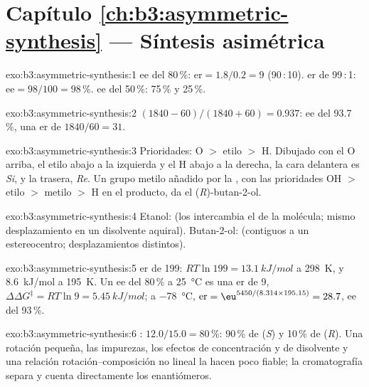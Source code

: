 \section*{Capítulo \ref{ch:b3:asymmetric-synthesis} --- Síntesis asimétrica}

\begin{solution}{exo:b3:asymmetric-synthesis:1}
ee del 80\,\%: $\mathrm{er} = 1.8/0.2 = 9$ (90\,:\,10). er de 99\,:\,1: $\mathrm{ee} = 98/100 = 98$\,\%. ee del 50\,\%: 75\,\% y 25\,\%.
\end{solution}

\begin{solution}{exo:b3:asymmetric-synthesis:2}
$(1840 - 60)/(1840 + 60) = 0.937$: ee del 93.7\,\%, una er de $1840/60 = 31$.
\end{solution}

\begin{solution}{exo:b3:asymmetric-synthesis:3}
Prioridades: O $>$ etilo $>$ H. Dibujado con el O arriba, el etilo abajo a la izquierda y el H abajo a la derecha, la
cara delantera es \textit{Si}, y la trasera, \textit{Re}. Un grupo metilo añadido por la , con
las prioridades OH $>$ etilo $>$ metilo $>$ H en el producto, da el (\textit{R})-butan-2-ol.
\end{solution}

\begin{solution}{exo:b3:asymmetric-synthesis:4}
Etanol:  (los intercambia el  de la molécula; mismo
desplazamiento en un disolvente aquiral). Butan-2-ol:  (contiguos a un estereocentro;
desplazamientos distintos).
\end{solution}

\begin{solution}{exo:b3:asymmetric-synthesis:5}
er de 199: $RT\ln 199 = \qty{13.1}{kJ/mol}$ a \qty{298}{K}, y \qty{8.6}{kJ/mol} a \qty{195}{K}. Un ee del 80\,\% a \qty{25}{\celsius} es una er de 9,
$\Delta\Delta G^\ddagger = RT\ln 9 = \qty{5.45}{kJ/mol}$; a \qty{-78}{\celsius}, $\mathrm{er} = \eu^{5450/(8.314 \times 195.15)} = 28.7$, ee del 93\,\%.
\end{solution}

\begin{solution}{exo:b3:asymmetric-synthesis:6}
: $12.0/15.0 = 80$\,\%: 90\,\% de (\textit{S}) y 10\,\% de (\textit{R}). Una rotación pequeña, las impurezas,
los efectos de concentración y de disolvente y una relación rotación--composición no lineal
la hacen poco fiable; la cromatografía separa y cuenta directamente los
enantiómeros.
\end{solution}

